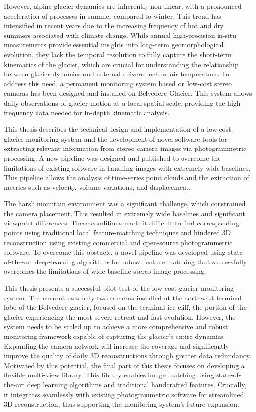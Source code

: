 However, alpine glacier dynamics are inherently non-linear, with a pronounced acceleration of processes in summer compared to winter.  
This trend has intensified in recent years due to the increasing frequency of hot and dry summers associated with climate change. 
While annual high-precision in-situ measurements provide essential insights into long-term geomorphological evolution, they lack the temporal resolution to fully capture the short-term kinematics of the glacier, which are crucial for
understanding the relationship between glacier dynamics and external drivers such as air temperature.
To address this need, a permanent monitoring system based on low-cost stereo cameras has been designed and installed on Belvedere Glacier. 
This system allows daily observations of glacier motion at a local spatial scale,
providing the high-frequency data needed for in-depth kinematic analysis.

This thesis describes the technical design and implementation of a low-cost glacier monitoring system and the development of novel software tools for extracting relevant information from stereo camera images via photogrammetric processing. 
A new pipeline was designed and published to overcome the limitations of existing software in handling images with extremely wide baselines. 
This pipeline allows the analysis of time-series point clouds and the extraction of metrics such as velocity, volume variations, and displacement.

The harsh mountain environment was a significant challenge, which constrained the camera placement.
This resulted in extremely wide baselines and significant viewpoint differences.  
These conditions made it difficult to find corresponding points using traditional local feature-matching techniques and hindered 3D reconstruction using existing commercial and open-source photogrammetric software.
To overcome this obstacle, a novel pipeline was developed using state-of-the-art deep-learning algorithms for robust feature matching that successfully overcomes the limitations of wide baseline stereo image processing.

This thesis presents a successful pilot test of the low-cost glacier monitoring system.
The current uses only two cameras installed at the northwest terminal lobe of the Belvedere glacier, focused on the terminal ice cliff, the portion of the glacier experiencing the most severe retreat and fast evolution. 
However, the system needs to be scaled up to achieve a more comprehensive and robust monitoring framework capable of capturing the glacier's entire dynamics. 
Expanding the camera network will increase the coverage and significantly improve the quality of daily 3D reconstructions through greater data redundancy.
Motivated by this potential, the final part of this thesis focuses on developing a flexible multi-view library. 
This library enables image matching using state-of-the-art deep learning algorithms and traditional handcrafted features. 
Crucially, it integrates seamlessly with existing photogrammetric software for streamlined 3D reconstruction, thus supporting the monitoring system's future expansion.



